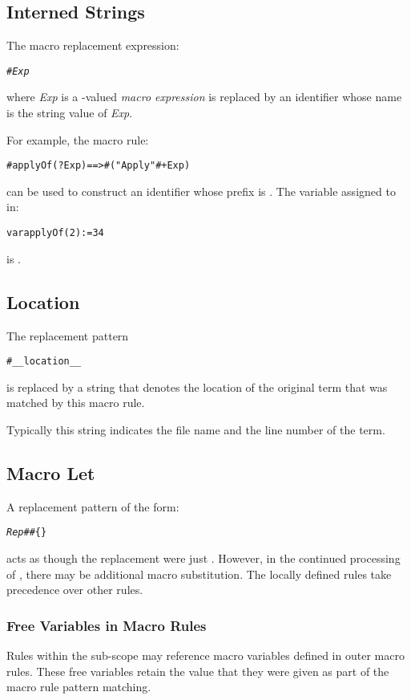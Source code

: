 \subsection{Interned Strings}
The macro replacement expression:
\begin{alltt}
#\tlda \emph{Exp}
\end{alltt}
where \emph{Exp} is a -valued \emph{macro expression} is replaced by an identifier whose name is the string value of \emph{Exp}.

For example, the macro rule:
\begin{alltt}
#applyOf(?Exp) ==> #\tlda("Apply"#+Exp)
\end{alltt}
can be used to construct an identifier whose prefix is . The variable assigned to in:
\begin{alltt}
var applyOf(2) := 34
\end{alltt}
is .

\subsection{Location}
\label{locationMacro}

The replacement pattern 
\begin{alltt}
#__location__
\end{alltt}
is replaced by a string that denotes the location of the original term that was matched by this macro rule.

Typically this string indicates the file name and the line number of the term.

\subsection{Macro Let}
\label{ScopedMacros}
A replacement pattern of the form:
\begin{alltt}
\emph{Rep} ## \{ \sequence{;} \}
\end{alltt}
acts as though the replacement were just . However, in the continued processing of , there may be additional macro substitution. The locally defined rules take precedence over other rules.

\subsubsection{Free Variables in Macro Rules}
Rules within the sub-scope may reference macro variables defined in outer macro rules. These free variables retain the value that they were given as part of the macro rule pattern matching.

